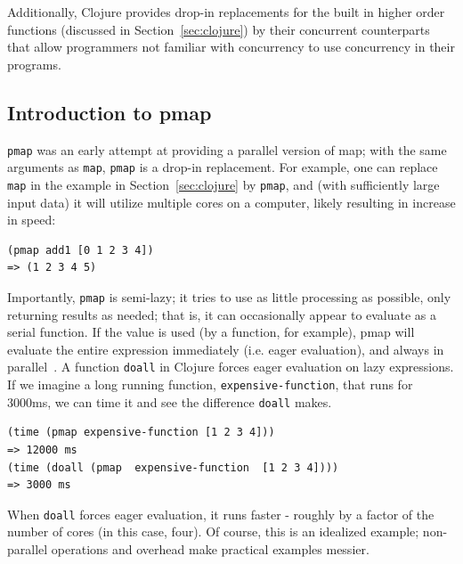 \documentclass[12pt]{article}
\newcommand{\comment}[1]{{\bf \tt  {#1}}}
\newcommand{\emcomment}[1]{\textcolor{ForestGreen}{\comment{Elena: {#1}}}}
\newcommand{\hfcomment}[1]{\textcolor{Teal}{\comment{Henry: {#1}}}}
\newcommand{\clocode}[1]{{\texttt {#1}}}
\begin{document}
Additionally, Clojure provides drop-in replacements for the built in higher order functions (discussed in Section~\ref{sec:clojure}) by their concurrent counterparts that allow programmers not familiar with concurrency to use concurrency in their programs.


\subsection{Introduction to pmap}\label{sec:pmap}
\clocode{pmap} was an early attempt at providing a parallel version of map; with the same arguments as \clocode{map}, \clocode{pmap} is a drop-in replacement. For example, one can replace \clocode{map} in the example in Section~\ref{sec:clojure} by \clocode{pmap}, and (with sufficiently large input data) it will utilize multiple cores on a computer, likely resulting in increase in speed:   
\begin{verbatim}
(pmap add1 [0 1 2 3 4])
=> (1 2 3 4 5)
\end{verbatim}
Importantly, \clocode{pmap} is semi-lazy; it tries to use as little processing as possible, only returning results as needed; that is, it can occasionally appear to evaluate as a serial function. %
If the value is used (by a function, for example), pmap will evaluate the entire expression immediately (i.e. eager evaluation), and always %
 in parallel~\cite{Pmap}. A function \clocode{doall} in Clojure forces eager evaluation on lazy expressions. 
If we imagine a long running function, \clocode{expensive-function}, that runs for 3000ms, we can time it and see the difference \clocode{doall} makes.
\begin{verbatim}
(time (pmap expensive-function [1 2 3 4]))
=> 12000 ms 
(time (doall (pmap  expensive-function  [1 2 3 4])))
=> 3000 ms
\end{verbatim}
When \clocode{doall} forces eager evaluation, it runs faster - roughly by a factor of the number of cores (in this case, four). Of course, this is an idealized example; non-parallel operations and overhead make practical examples messier.
\end{document}
